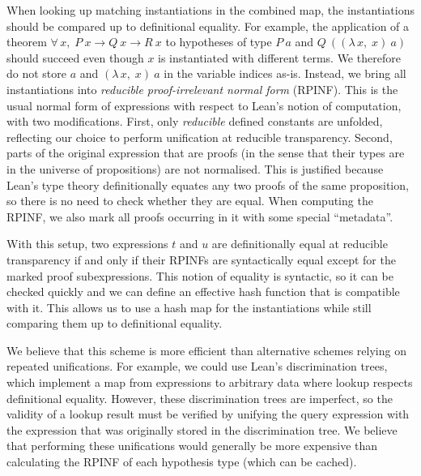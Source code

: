 \documentclass[runningheads,leqno]{llncs}
\newcommand{\Lam}[2]{\ensuremath{\lambda\, #1,\; #2}}
\newcommand{\All}[2]{\ensuremath{\forall\, #1,\; #2}}
\begin{document}
When looking up matching instantiations in the combined map, the instantiations should be compared up to definitional equality.
For example, the application of a theorem $\All{x}{P~x → Q~x → R~x}$ to hypotheses of type $P~a$ and $Q~((\Lam{x}{x})~a)$ should succeed even though $x$ is instantiated with different terms.
We therefore do not store $a$ and $(\Lam{x}{x})~a$ in the variable indices as-is.
Instead, we bring all instantiations into \emph{reducible proof-irrelevant normal form} (RPINF).
This is the usual normal form of expressions with respect to Lean's notion of computation, with two modifications.
First, only \emph{reducible} defined constants are unfolded, reflecting our choice to perform unification at reducible transparency.
Second, parts of the original expression that are proofs (in the sense that their types are in the universe of propositions) are not normalised.
This is justified because Lean's type theory definitionally equates any two proofs of the same proposition, so there is no need to check whether they are equal.
When computing the RPINF, we also mark all proofs occurring in it with some special \enquote{metadata}.

With this setup, two expressions $t$ and $u$ are definitionally equal at reducible transparency if and only if their RPINFs are syntactically equal except for the marked proof subexpressions.
This notion of equality is syntactic, so it can be checked quickly and we can define an effective hash function that is compatible with it.
This allows us to use a hash map for the instantiations while still comparing them up to definitional equality.

We believe that this scheme is more efficient than alternative schemes relying on repeated unifications.
For example, we could use Lean's discrimination trees, which implement a map from expressions to arbitrary data where lookup respects definitional equality.
However, these discrimination trees are imperfect, so the validity of a lookup result must be verified by unifying the query expression with the expression that was originally stored in the discrimination tree.
We believe that performing these unifications would generally be more expensive than calculating the RPINF of each hypothesis type (which can be cached).
\end{document}
